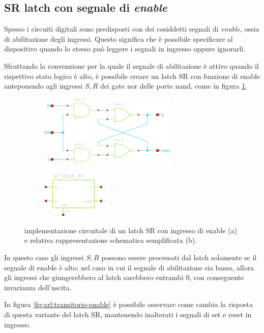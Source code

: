 \subsection*{SR latch con segnale di \textit{enable}}
	Spesso i circuiti digitali sono predisposti con dei cosiddetti segnali di \textit{enable}, ossia di abilitazione degli ingressi. Questo significa che è possibile specificare al dispositivo quando lo stesso può leggere i segnali in ingresso oppure ignorarli.
	
	Sfruttando la convenzione per la quale il segnale di abilitazione è attivo quando il rispettivo stato logico è alto, è possibile creare un latch SR con funzione di enable anteponendo agli ingressi $S,R$ dei gate nor delle porte nand, come in figura \ref{fig:srl:schematico-enable}.
	
	\begin{figure}[bht]
		\centering
		\begin{subfigure}{0.48\linewidth}
			\centering
			\includegraphics[width=6.5cm]{Immagini/srlatch-en-sch} \caption{}
		\end{subfigure}
		\begin{subfigure}{0.48\linewidth}
			\centering
			\includegraphics[width=3cm]{Immagini/srlatch-en-simple} \caption{}
		\end{subfigure}
		\caption{implementazione circuitale di un latch SR con ingresso di enable (a) e relativa rappresentazione schematica semplificata (b).}
		\label{fig:srl:schematico-enable}
	\end{figure}
	
	In questo caso gli ingressi $S,R$ possono essere processati dal latch solamente se il segnale di enable è alto; nel caso in cui il segnale di abilitazione sia basso, allora gli ingressi che giungerebbero al latch sarebbero entrambi 0, con conseguente invarianza dell'uscita.

	In figura \ref{fig:srl:transitorio-enable} è possibile osservare come cambia la risposta di questa variante del latch SR, mantenendo inalterati i segnali di set e reset in ingresso.
	
